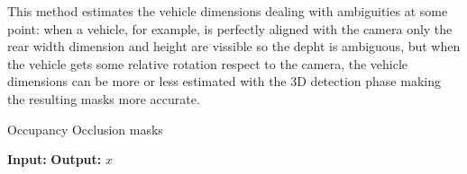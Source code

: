 This method estimates the vehicle dimensions dealing with ambiguities at some point: when a vehicle, for example, is perfectly aligned with the camera only the rear width dimension and height are vissible so the depht is ambiguous, but when the vehicle gets some relative rotation respect to the camera, the vehicle dimensions can be more or less estimated with the 3D detection phase making the resulting masks more accurate. 

\begin{algorithm}
    \caption{Occupancy Occlusion masks}
    \label{algorithm:occ_masks}
    \footnotesize

    \begin{algorithmic}[1]
        \State \textbf{Input:} 
        \State \textbf{Output:} 
        \State \Return $x$
    \end{algorithmic}
\end{algorithm}


